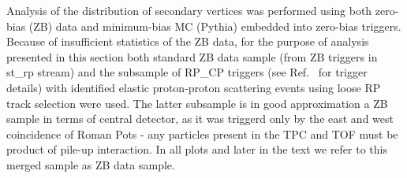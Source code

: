Analysis of the distribution of secondary vertices was performed using both zero-bias (ZB) data and minimum-bias MC (Pythia) embedded into zero-bias triggers. Because of insufficient statistics of the ZB data, for the purpose of analysis presented in this section both standard ZB data sample (from ZB triggers in st\_rp stream) and the subsample of RP\_CP triggers (see Ref.~\cite{onlineRpTriggersMonitoring} for trigger details) with identified elastic proton-proton scattering events using loose RP track selection were used. The latter subsample is in good approximation a ZB sample in terms of central detector, as it was triggerd only by the east and west coincidence of Roman Pots - any particles present in the TPC and TOF must be product of pile-up interaction. In all plots and later in the text we refer to this merged sample as ZB data sample. 

